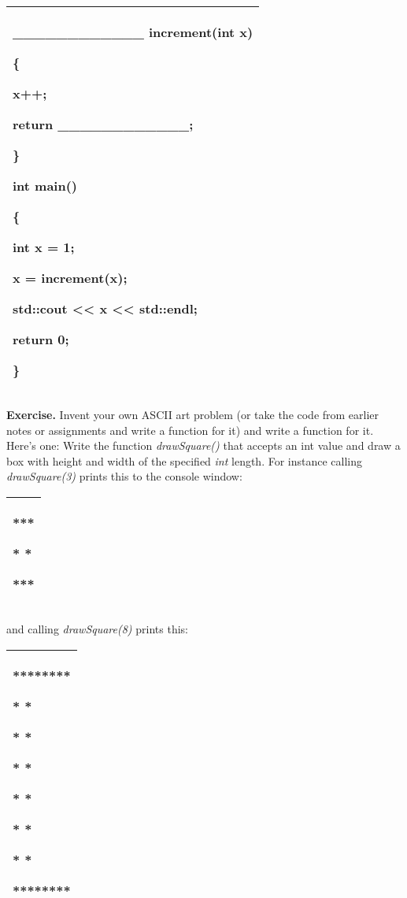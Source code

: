 \documentclass[
]{article}
\begin{document}
\begin{longtable}[]{@{}l@{}}
\toprule
\endhead
\begin{minipage}[t]{0.97\columnwidth}\raggedright
\_\_\_\_\_\_\_\_\_\_\_\_ increment(int x)

\{

x++;

return \_\_\_\_\_\_\_\_\_\_\_\_;

\}

int main()

\{

int x = 1;

x = increment(x);

std::cout \textless\textless{} x \textless\textless{} std::endl;

return 0;

\}\strut
\end{minipage}\tabularnewline
\bottomrule
\end{longtable}

\textbf{Exercise.} Invent your own ASCII art problem (or take the code
from earlier notes or assignments and write a function for it) and write
a function for it. Here's one: Write the function \emph{drawSquare()}
that accepts an int value and draw a box with height and width of the
specified \emph{int} length. For instance calling \emph{drawSquare(3)}
prints this to the console window:

\begin{longtable}[]{@{}l@{}}
\toprule
\endhead
\begin{minipage}[t]{0.97\columnwidth}\raggedright
***

* *

***\strut
\end{minipage}\tabularnewline
\bottomrule
\end{longtable}

and calling \emph{drawSquare(8)} prints this:

\begin{longtable}[]{@{}l@{}}
\toprule
\endhead
\begin{minipage}[t]{0.97\columnwidth}\raggedright
********

* *

* *

* *

* *

* *

* *

********\strut
\end{minipage}\tabularnewline
\bottomrule
\end{longtable}
\end{document}
